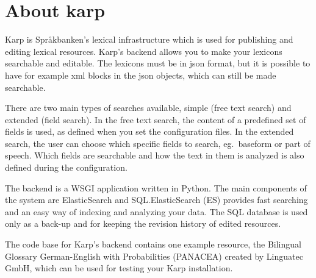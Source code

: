\documentclass[
12pt, %
a4paper, %
oneside, %
headinclude,footinclude, %
BCOR0mm, %
]{scrartcl}
\begin{document}



\newpage %


\section{About karp}\label{sec:about_karp}
Karp is Språkbanken’s lexical infrastructure which is used for publishing and editing lexical resources. Karp's backend allows you to make your lexicons searchable and editable. The lexicons must be in json format, but it is possible to have for example xml
blocks in the json objects, which can still be made searchable. %


There are two main types of searches available, simple (free text search)
and extended (field search).
In the free text search, the content of a predefined set of fields is used, as defined when you set the configuration files.
In the extended search, the user can choose which specific fields to search,
eg.\ baseform or part of speech. Which
fields are searchable and how the text in them is analyzed is also defined during the configuration.

The backend is a WSGI application written in Python.
The main components of the system are ElasticSearch and SQL.\@ ElasticSearch (ES) provides fast searching and
an easy way of indexing and analyzing your data. The SQL database is used only as a back-up and for keeping
the revision history of edited resources.

The code base for Karp's backend contains one example resource, the Bilingual Glossary German-English with Probabilities (PANACEA) created by Linguatec GmbH, which can be used for testing your Karp installation.
\end{document}
